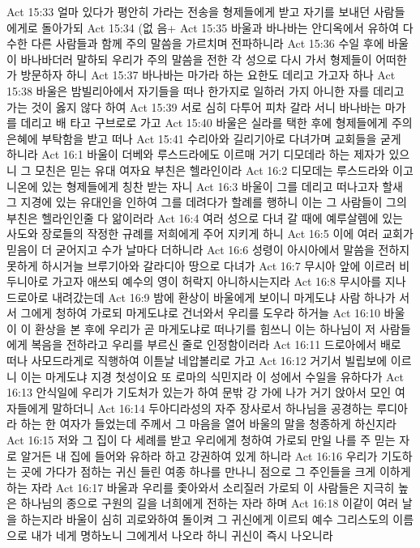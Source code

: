 Act 15:33  얼마 있다가 평안히 가라는 전송을 형제들에게 받고 자기를 보내던 사람들에게로 돌아가되
Act 15:34  (없 음+
Act 15:35  바울과 바나바는 안디옥에서 유하여 다수한 다른 사람들과 함께 주의 말씀을 가르치며 전파하니라
Act 15:36  수일 후에 바울이 바나바더러 말하되 우리가 주의 말씀을 전한 각 성으로 다시 가서 형제들이 어떠한가 방문하자 하니
Act 15:37  바나바는 마가라 하는 요한도 데리고 가고자 하나
Act 15:38  바울은 밤빌리아에서 자기들을 떠나 한가지로 일하러 가지 아니한 자를 데리고 가는 것이 옳지 않다 하여
Act 15:39  서로 심히 다투어 피차 갈라 서니 바나바는 마가를 데리고 배 타고 구브로로 가고
Act 15:40  바울은 실라를 택한 후에 형제들에게 주의 은혜에 부탁함을 받고 떠나
Act 15:41  수리아와 길리기아로 다녀가며 교회들을 굳게 하니라
Act 16:1  바울이 더베와 루스드라에도 이르매 거기 디모데라 하는 제자가 있으니 그 모친은 믿는 유대 여자요 부친은 헬라인이라
Act 16:2  디모데는 루스드라와 이고니온에 있는 형제들에게 칭찬 받는 자니
Act 16:3  바울이 그를 데리고 떠나고자 할새 그 지경에 있는 유대인을 인하여 그를 데려다가 할례를 행하니 이는 그 사람들이 그의 부친은 헬라인인줄 다 앎이러라
Act 16:4  여러 성으로 다녀 갈 때에 예루살렘에 있는 사도와 장로들의 작정한 규례를 저희에게 주어 지키게 하니
Act 16:5  이에 여러 교회가 믿음이 더 굳어지고 수가 날마다 더하니라
Act 16:6  성령이 아시아에서 말씀을 전하지 못하게 하시거늘 브루기아와 갈라디아 땅으로 다녀가
Act 16:7  무시아 앞에 이르러 비두니아로 가고자 애쓰되 예수의 영이 허락지 아니하시는지라
Act 16:8  무시아를 지나 드로아로 내려갔는데
Act 16:9  밤에 환상이 바울에게 보이니 마게도냐 사람 하나가 서서 그에게 청하여 가로되 마게도냐로 건너와서 우리를 도우라 하거늘
Act 16:10  바울이 이 환상을 본 후에 우리가 곧 마게도냐로 떠나기를 힘쓰니 이는 하나님이 저 사람들에게 복음을 전하라고 우리를 부르신 줄로 인정함이러라
Act 16:11  드로아에서 배로 떠나 사모드라게로 직행하여 이튿날 네압볼리로 가고
Act 16:12  거기서 빌립보에 이르니 이는 마게도냐 지경 첫성이요 또 로마의 식민지라 이 성에서 수일을 유하다가
Act 16:13  안식일에 우리가 기도처가 있는가 하여 문밖 강 가에 나가 거기 앉아서 모인 여자들에게 말하더니
Act 16:14  두아디라성의 자주 장사로서 하나님을 공경하는 루디아라 하는 한 여자가 들었는데 주께서 그 마음을 열어 바울의 말을 청종하게 하신지라
Act 16:15  저와 그 집이 다 세례를 받고 우리에게 청하여 가로되 만일 나를 주 믿는 자로 알거든 내 집에 들어와 유하라 하고 강권하여 있게 하니라
Act 16:16  우리가 기도하는 곳에 가다가 점하는 귀신 들린 여종 하나를 만나니 점으로 그 주인들을 크게 이하게 하는 자라
Act 16:17  바울과 우리를 좇아와서 소리질러 가로되 이 사람들은 지극히 높은 하나님의 종으로 구원의 길을 너희에게 전하는 자라 하며
Act 16:18  이같이 여러 날을 하는지라 바울이 심히 괴로와하여 돌이켜 그 귀신에게 이르되 예수 그리스도의 이름으로 내가 네게 명하노니 그에게서 나오라 하니 귀신이 즉시 나오니라
